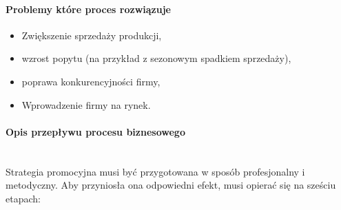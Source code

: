 \documentclass[a4paper, 12pt]{article}
\begin{document}
\paragraph{Problemy które proces rozwiązuje}
\begin{itemize}
	\item Zwiększenie sprzedaży produkcji,
	\item wzrost popytu (na przykład z sezonowym spadkiem sprzedaży),
	\item poprawa konkurencyjności firmy,
	\item Wprowadzenie firmy na rynek.
\end{itemize}
\paragraph{Opis przepływu procesu biznesowego}\mbox{}\\
\hspace*{1 cm}Strategia promocyjna musi być przygotowana w sposób profesjonalny i metodyczny. Aby przyniosła ona odpowiedni efekt, musi opierać się na sześciu etapach:
\end{document}
